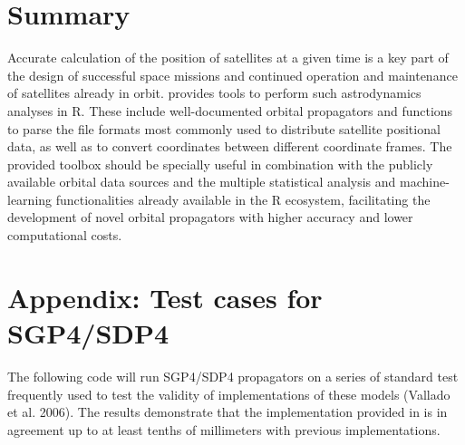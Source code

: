 \hypertarget{summary}{%
\section{Summary}\label{summary}}

Accurate calculation of the position of satellites at a given time is a key part of the design of successful space missions and continued operation and maintenance of satellites already in orbit.  provides tools to perform such astrodynamics analyses in R. These include well-documented orbital propagators and functions to parse the file formats most commonly used to distribute satellite positional data, as well as to convert coordinates between different coordinate frames. The provided toolbox should be specially useful in combination with the publicly available orbital data sources and the multiple statistical analysis and machine-learning functionalities already available in the R ecosystem, facilitating the development of novel orbital propagators with higher accuracy and lower computational costs.

\hypertarget{appendix-test-cases-for-sgp4sdp4}{%
\section{Appendix: Test cases for SGP4/SDP4}\label{appendix-test-cases-for-sgp4sdp4}}

The following code will run SGP4/SDP4 propagators on a series of standard test frequently used to test the validity of implementations of these models (Vallado et al. 2006). The results demonstrate that the implementation provided in  is in agreement up to at least tenths of millimeters with previous implementations.

